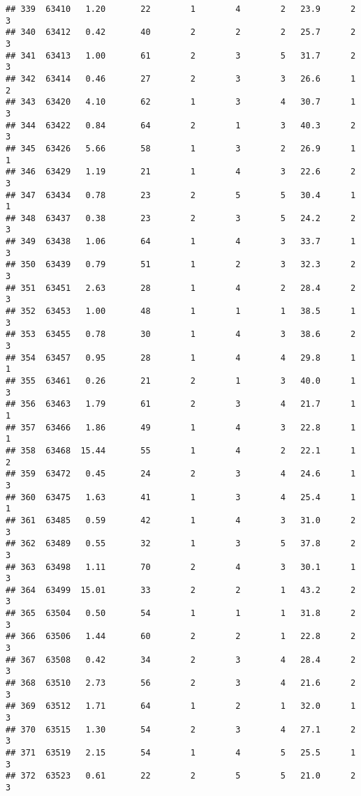\documentclass[
]{article}
\begin{document}
\begin{verbatim}
## 339  63410   1.20       22        1        4        2   23.9      2      3
## 340  63412   0.42       40        2        2        2   25.7      2      3
## 341  63413   1.00       61        2        3        5   31.7      2      3
## 342  63414   0.46       27        2        3        3   26.6      1      2
## 343  63420   4.10       62        1        3        4   30.7      1      3
## 344  63422   0.84       64        2        1        3   40.3      2      3
## 345  63426   5.66       58        1        3        2   26.9      1      1
## 346  63429   1.19       21        1        4        3   22.6      2      3
## 347  63434   0.78       23        2        5        5   30.4      1      1
## 348  63437   0.38       23        2        3        5   24.2      2      3
## 349  63438   1.06       64        1        4        3   33.7      1      3
## 350  63439   0.79       51        1        2        3   32.3      2      3
## 351  63451   2.63       28        1        4        2   28.4      2      3
## 352  63453   1.00       48        1        1        1   38.5      1      3
## 353  63455   0.78       30        1        4        3   38.6      2      3
## 354  63457   0.95       28        1        4        4   29.8      1      1
## 355  63461   0.26       21        2        1        3   40.0      1      3
## 356  63463   1.79       61        2        3        4   21.7      1      1
## 357  63466   1.86       49        1        4        3   22.8      1      1
## 358  63468  15.44       55        1        4        2   22.1      1      2
## 359  63472   0.45       24        2        3        4   24.6      1      3
## 360  63475   1.63       41        1        3        4   25.4      1      1
## 361  63485   0.59       42        1        4        3   31.0      2      3
## 362  63489   0.55       32        1        3        5   37.8      2      3
## 363  63498   1.11       70        2        4        3   30.1      1      3
## 364  63499  15.01       33        2        2        1   43.2      2      3
## 365  63504   0.50       54        1        1        1   31.8      2      3
## 366  63506   1.44       60        2        2        1   22.8      2      3
## 367  63508   0.42       34        2        3        4   28.4      2      3
## 368  63510   2.73       56        2        3        4   21.6      2      3
## 369  63512   1.71       64        1        2        1   32.0      1      3
## 370  63515   1.30       54        2        3        4   27.1      2      3
## 371  63519   2.15       54        1        4        5   25.5      1      3
## 372  63523   0.61       22        2        5        5   21.0      2      3

\end{verbatim}
\end{document}
